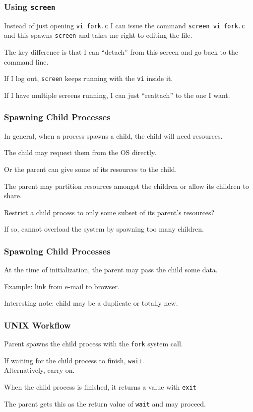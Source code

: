 \begin{frame}
\frametitle{Using \texttt{screen}}
Instead of just opening \texttt{vi fork.c} I can issue the command \texttt{screen vi fork.c} and this spawns \texttt{screen} and takes me right to editing the file. 

The key difference is that I can ``detach'' from this screen and go back to the command line.

If I log out, \texttt{screen} keeps running with the \texttt{vi} inside it.

 If I have multiple screens running, I can just ``reattach'' to the one I want.

\end{frame}

\begin{frame}
\frametitle{Spawning Child Processes}

In general, when a process spawns a child, the child will need resources. 

The child may request them from the OS directly.

Or the parent can give some of its resources to the child. 

The parent may partition resources amongst the children or allow its children to share.

Restrict a child process to only some subset of its parent's resources?

 If so, cannot overload the system by spawning too many children.

\end{frame}

\begin{frame}
\frametitle{Spawning Child Processes}

At the time of initialization, the parent may pass the child some data.

Example: link from e-mail to browser.

Interesting note: child may be a duplicate or totally new.

\end{frame}

\begin{frame}
\frametitle{UNIX Workflow}

Parent spawns the child process with the \texttt{fork} system call. 

If waiting for the child process to finish, \texttt{wait}.\\
\quad Alternatively, carry on.

When the child process is finished, it returns a value with \texttt{exit} 

The parent gets this as the return value of \texttt{wait} and may proceed.
\end{frame}

